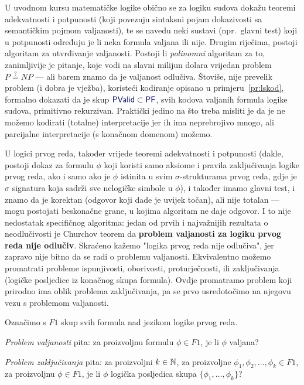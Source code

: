 U uvodnom kursu matematičke logike obično se za logiku sudova dokažu teoremi adekvatnosti i potpunosti (koji povezuju sintaksni pojam dokazivosti sa semantičkim pojmom valjanosti), te se navedu neki sustavi (npr.\ glavni test) koji u potpunosti određuju je li neka formula valjana ili nije. Drugim riječima, postoji algoritam za utvrđivanje valjanosti. Postoji li \emph{polinomni} algoritam za to, zanimljivije je pitanje, koje vodi na slavni milijun dolara vrijedan problem $P\stackrel?=NP$ --- ali barem znamo da je valjanost odlučiva. Štoviše, nije prevelik problem (i dobra je vježba), koristeći kodiranje opisano u primjeru~\ref{pr:lskod}, formalno dokazati da je skup $\f{PValid}\subset\f{PF}$, svih kodova valjanih formula logike sudova, primitivno rekurzivan. Praktički jedino na što treba misliti je da je ne možemo kodirati (totalne) interpretacije jer ih ima neprebrojivo mnogo, ali parcijalne interpretacije (s konačnom domenom) možemo.

U logici prvog reda, također vrijede teoremi adekvatnosti i potpunosti (dakle, postoji dokaz za formulu $\phi$ koji koristi samo aksiome i pravila zaključivanja logike prvog reda, ako i samo ako je $\phi$ istinita u svim $\sigma$-strukturama prvog reda, gdje je $\sigma$ signatura koja sadrži sve nelogičke simbole u $\phi$), i također imamo glavni test, i znamo da je korektan (odgovor koji dade je uvijek točan), ali nije totalan --- mogu postojati beskonačne grane, u kojima algoritam ne daje odgovor. I to nije nedostatak specifičnog algoritma: jedan od prvih i najvažnijih rezultata o neodlučivosti je Churchov teorem da \textbf{problem valjanosti za logiku prvog reda nije odlučiv}. Skraćeno kažemo "logika prvog reda nije odlučiva", jer zapravo nije bitno da se radi o problemu valjanosti. Ekvivalentno možemo promatrati probleme ispunjivosti, oborivosti, proturječnosti, ili zaključivanja (logičke posljedice iz konačnog skupa formula). Ovdje promatramo problem koji prirodno ima oblik problema zaključivanja, pa se prvo usredotočimo na njegovu vezu s problemom valjanosti.

\begin{definicija}[{name=[problem valjanosti i problem zaključivanja]}]
Označimo s $F1$ skup svih formula nad jezikom logike prvog reda.

\emph{Problem valjanosti} pita: za proizvoljnu formulu $\phi\in F1$, je li $\phi$ valjana?

\emph{Problem zaključivanja} pita: za proizvoljni $k\in{\mathbb N}$, za proizvoljne $\phi_1,\phi_2,\dotsc,\phi_k\in F1$, za proizvoljnu $\phi\in F1$, je li $\phi$ logička posljedica skupa $\{\phi_1,\dotsc,\phi_k\}$?
\end{definicija}


